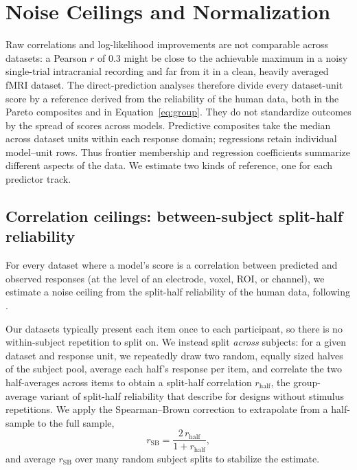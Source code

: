 \section{Noise Ceilings and Normalization}
\label{app:normalization}

Raw correlations and log-likelihood improvements are not comparable across datasets: a Pearson $r$ of 0.3 might be close to the achievable maximum in a noisy single-trial intracranial recording and far from it in a clean, heavily averaged fMRI dataset. The direct-prediction analyses therefore divide every dataset-unit score by a reference derived from the reliability of the human data, both in the Pareto composites and in Equation~\ref{eq:group}. They do not standardize outcomes by the spread of scores across models. Predictive composites take the median across dataset units within each response domain; regressions retain individual model--unit rows. Thus frontier membership and regression coefficients summarize different aspects of the data. We estimate two kinds of reference, one for each predictor track.

\subsection{Correlation ceilings: between-subject split-half reliability}
\label{app:corr-ceiling}

For every dataset where a model's score is a correlation between predicted and observed responses (at the level of an electrode, voxel, ROI, or channel), we estimate a noise ceiling from the split-half reliability of the human data, following \citet{vanbree2025noiseceiling}.

Our datasets typically present each item once to each participant, so there is no within-subject repetition to split on. We instead split \emph{across} subjects: for a given dataset and response unit, we repeatedly draw two random, equally sized halves of the subject pool, average each half's response per item, and correlate the two half-averages across items to obtain a split-half correlation $r_{\mathrm{half}}$, the group-average variant of split-half reliability that \citeauthor{vanbree2025noiseceiling} describe for designs without stimulus repetitions. We apply the Spearman--Brown correction to extrapolate from a half-sample to the full sample,
\[
r_{\mathrm{SB}} = \frac{2\,r_{\mathrm{half}}}{1 + r_{\mathrm{half}}},
\]
and average $r_{\mathrm{SB}}$ over many random subject splits to stabilize the estimate.

